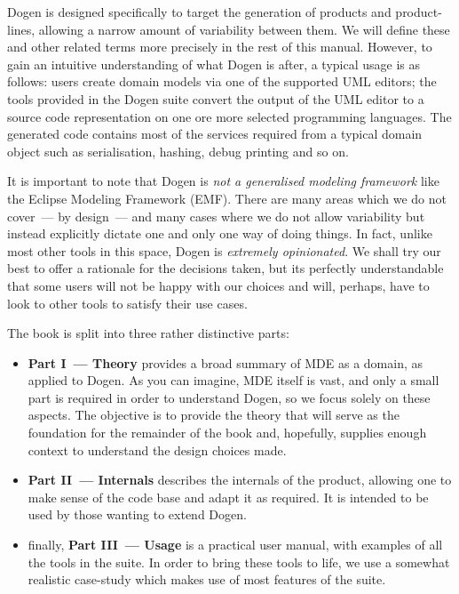 \documentclass{book}
\begin{document}
Dogen is designed specifically to target the generation of products
and product-lines, allowing a narrow amount of variability between
them. We will define these and other related terms more precisely in
the rest of this manual. However, to gain an intuitive understanding
of what Dogen is after, a typical usage is as follows: users create
domain models via one of the supported UML editors; the tools provided
in the Dogen suite convert the output of the UML editor to a source
code representation on one ore more selected programming
languages. The generated code contains most of the services required
from a typical domain object such as serialisation, hashing, debug
printing and so on.

It is important to note that Dogen is \emph{not a generalised modeling
  framework} like the Eclipse Modeling Framework
(EMF)\cite{Steinberg:2009:EEM:1197540}. There are many areas which we
do not cover~--- by design~--- and many cases where we do not allow
variability but instead explicitly dictate one and only one way of
doing things. In fact, unlike most other tools in this space, Dogen is
\emph{extremely opinionated}. We shall try our best to offer a
rationale for the decisions taken, but its perfectly understandable
that some users will not be happy with our choices and will, perhaps,
have to look to other tools to satisfy their use cases.

The book is split into three rather distinctive parts:

\begin{itemize}
  \item \textbf{Part I~--- Theory} provides a broad summary of MDE as
    a domain, as applied to Dogen. As you can imagine, MDE itself is
    vast, and only a small part is required in order to understand
    Dogen, so we focus solely on these aspects. The objective is to
    provide the theory that will serve as the foundation for the
    remainder of the book and, hopefully, supplies enough context to
    understand the design choices made.
  \item \textbf{Part II~--- Internals} describes the internals of the
    product, allowing one to make sense of the code base and adapt it
    as required. It is intended to be used by those wanting to extend
    Dogen.
  \item finally, \textbf{Part III~--- Usage} is a practical user
    manual, with examples of all the tools in the suite. In order to
    bring these tools to life, we use a somewhat realistic case-study
    which makes use of most features of the suite.
\end{itemize}
\end{document}
